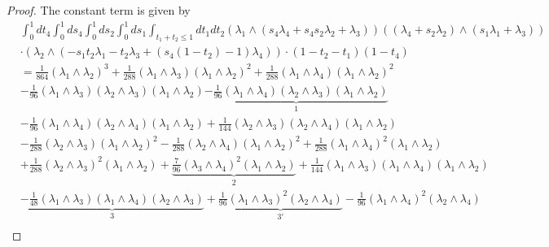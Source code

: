 \documentclass[11pt]{amsart}
\theoremstyle{definition}
\theoremstyle{remark}
\numberwithin{equation}{section}
\begin{document}
\begin{proof}
The constant term is given by
  \begin{align*}
     & \int^1_0dt_4\int^1_0ds_4\int^1_0ds_2\int^1_0ds_1\int_{t_1+t_2\leq 1}dt_1dt_2\left(\lambda_1\wedge (s_4\lambda_4+s_4s_2\lambda_2+\lambda_3) \right)\left( (\lambda_4+s_2\lambda_2)\wedge (s_1\lambda_1+\lambda_3)\right)  \\
   & \cdot \left(\lambda_2\wedge (-s_1t_2\lambda_1-t_2\lambda_3+(s_4(1-t_2)-1)\lambda_4)\right)\cdot(1-t_2-t_1) (1-t_4)\\
   &= \frac{1}{864}\left(\lambda_1 \wedge \lambda_2\right)^3+\frac{1}{288}\left(\lambda_1 \wedge \lambda_3\right)\left(\lambda_1 \wedge \lambda_2\right)^2+\frac{1}{288}\left(\lambda_1 \wedge \lambda_4\right)\left(\lambda_1 \wedge \lambda_2\right)^2 \\
& -\frac{1}{96}\left(\lambda_1 \wedge \lambda_3\right)\left(\lambda_2 \wedge \lambda_3\right)\left(\lambda_1 \wedge \lambda_2\right)\underbrace{-\frac{1}{96}\left(\lambda_1 \wedge \lambda_4\right)\left(\lambda_2 \wedge \lambda_3\right)\left(\lambda_1 \wedge \lambda_2\right)}_{\boxed{1}} \\
& -\frac{1}{96}\left(\lambda_1 \wedge \lambda_4\right)\left(\lambda_2 \wedge \lambda_4\right)\left(\lambda_1 \wedge \lambda_2\right)+\frac{1}{144}\left(\lambda_2 \wedge \lambda_3\right)\left(\lambda_2 \wedge \lambda_4\right)\left(\lambda_1 \wedge \lambda_2\right) \\
& -\frac{1}{288}\left(\lambda_2 \wedge \lambda_3\right)\left(\lambda_1 \wedge \lambda_2\right)^2-\frac{1}{288}\left(\lambda_2 \wedge \lambda_4\right)\left(\lambda_1 \wedge \lambda_2\right)^2+\frac{1}{288}\left(\lambda_1 \wedge \lambda_4\right)^2\left(\lambda_1 \wedge \lambda_2\right) \\
& +\frac{1}{288}\left(\lambda_2 \wedge \lambda_3\right)^2\left(\lambda_1 \wedge \lambda_2\right)+\underbrace{\frac{7}{96}\left(\lambda_3 \wedge \lambda_4\right)^2\left(\lambda_1 \wedge \lambda_2\right)}_{\boxed{2}}+\frac{1}{144}\left(\lambda_1 \wedge \lambda_3\right)\left(\lambda_1 \wedge \lambda_4\right)\left(\lambda_1 \wedge \lambda_2\right) \\
& \underbrace{-\frac{1}{48}\left(\lambda_1 \wedge \lambda_3\right)\left(\lambda_1 \wedge \lambda_4\right)\left(\lambda_2 \wedge \lambda_3\right)}_{\boxed{3}}+\underbrace{\frac{1}{96}\left(\lambda_1 \wedge \lambda_3\right)^2\left(\lambda_2 \wedge \lambda_4\right)}_{\boxed{3'}}-\frac{1}{96}\left(\lambda_1 \wedge \lambda_4\right)^2\left(\lambda_2 \wedge \lambda_4\right) \\

\end{align*}
\end{proof}
\end{document}

